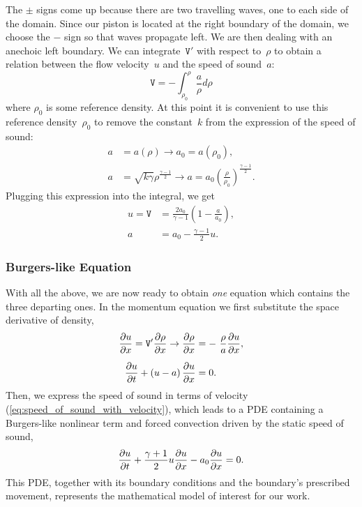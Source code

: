 \documentclass[../../thesis.tex]{subfiles}
\begin{document}
The $\pm$ signs come up because there are two travelling waves, one to each side of the domain.
Since our piston is located at the right boundary of the domain, 
we choose the $-$ sign so that waves propagate left.
We are then dealing with an anechoic left boundary.
We can integrate~$\mathtt{V}'$ with respect to~$\rho$ to obtain a relation between the flow velocity~$u$ and the speed of sound~$a$:
\begin{equation}
    \mathtt{V} = - \int_{\rho_0}^{\rho} \frac{a}{\rho} d\rho 
\end{equation}
where $\rho_0$ is some reference density.
At this point it is convenient to use this reference density~$\rho_0$ to remove the constant~$k$ from the expression of the speed of sound:
\begin{subequations}
    \begin{align}
        a &= a(\rho) 
        \rightarrow 
        a_0 = a(\rho_0),
        \\
        a &= \sqrt{k \gamma} \rho^{\frac{\gamma-1}{2}} 
        \rightarrow
        a = a_0 \left(\frac{\rho}{\rho_0}\right)^{\frac{\gamma-1}{2}}.
    \end{align}    
\end{subequations}
Plugging this expression into the integral, we get
\begin{subequations}
    \begin{align}
        u = \mathtt{V} &= \frac{2a_0}{\gamma-1}\left(1 - \frac{a}{a_0}\right),
        \\[2mm]
        a &= a_0 - \frac{\gamma-1}{2}u. \label{eq:speed_of_sound_with_velocity}
    \end{align}
\end{subequations}

\subsubsection{Burgers-like Equation}
With all the above, we are now ready to obtain \textit{one} equation which contains the three departing ones.
In the momentum equation we first substitute the space derivative of density,
\begin{subequations}
    \begin{align}
        \pdv{u}{x} = \mathtt{V}' \pdv{\rho}{x} \rightarrow \pdv{\rho}{x} &= - \frac{\rho}{a} \pdv{u}{x},
        \\[2mm]
        \pdv{u}{t} + \left(u-a\right)\pdv{u}{x} &= 0.
    \end{align}    
\end{subequations}
Then, we express the speed of sound in terms of velocity (\ref{eq:speed_of_sound_with_velocity}),
which leads to a PDE containing a Burgers-like nonlinear term and 
forced convection driven by the static speed of sound, 
\begin{equation}
    \pdv{u}{t} + \frac{\gamma+1}{2}u \pdv{u}{x} - a_0\pdv{u}{x} = 0.
\end{equation}
This PDE, together with its boundary conditions and the boundary's prescribed movement, represents the mathematical model of interest for our work. 
\end{document}
